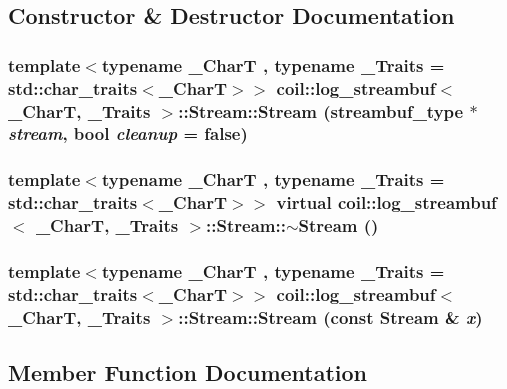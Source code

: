 \subsection{Constructor \& Destructor Documentation}
\subsubsection[{Stream}]{\setlength{\rightskip}{0pt plus 5cm}template$<$typename \_\-CharT , typename \_\-Traits  = std::char\_\-traits$<$\_\-CharT$>$$>$ {\bf coil::log\_\-streambuf}$<$ \_\-CharT, \_\-Traits $>$::Stream::Stream ({\bf streambuf\_\-type} $\ast$ {\em stream}, \/  bool {\em cleanup} = {\ttfamily false})\hspace{0.3cm}{\ttfamily  [inline]}}\label{structcoil_1_1log__streambuf_1_1Stream_a8e445a1569a7c6aadb43f4fbf2562a20}
\subsubsection[{$\sim$Stream}]{\setlength{\rightskip}{0pt plus 5cm}template$<$typename \_\-CharT , typename \_\-Traits  = std::char\_\-traits$<$\_\-CharT$>$$>$ virtual {\bf coil::log\_\-streambuf}$<$ \_\-CharT, \_\-Traits $>$::Stream::$\sim$Stream ()\hspace{0.3cm}{\ttfamily  [inline, virtual]}}\label{structcoil_1_1log__streambuf_1_1Stream_a19ab5a6862a1dc2e20da102b744d5737}
\subsubsection[{Stream}]{\setlength{\rightskip}{0pt plus 5cm}template$<$typename \_\-CharT , typename \_\-Traits  = std::char\_\-traits$<$\_\-CharT$>$$>$ {\bf coil::log\_\-streambuf}$<$ \_\-CharT, \_\-Traits $>$::Stream::Stream (const {\bf Stream} \& {\em x})\hspace{0.3cm}{\ttfamily  [inline]}}\label{structcoil_1_1log__streambuf_1_1Stream_a494575e16ffcad41ed6741f139bfef9a}


\subsection{Member Function Documentation}
